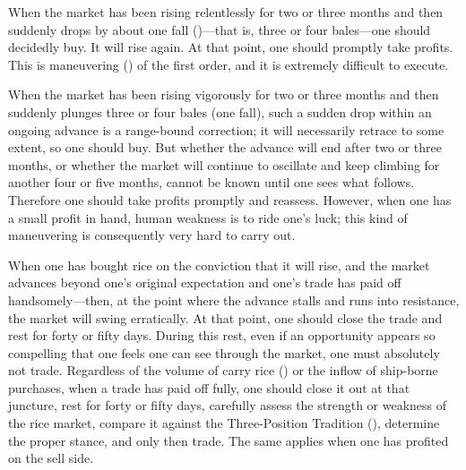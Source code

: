 \begin{sokyubox}
{\small\itshape\color{sokyubar} }

\medskip
When the market has been rising relentlessly for two or three
months and then suddenly drops by about one fall ()---that is, three or four bales---one should
decidedly buy. It will rise again. At that point, one should
promptly take profits. This is maneuvering () of
the first order, and it is extremely difficult to execute.
\end{sokyubox}

\commentary
When the market has been rising vigorously for two or three months
and then suddenly plunges three or four bales (one fall), such a
sudden drop within an ongoing advance is a range-bound correction;
it will necessarily retrace to some extent, so one should buy. But
whether the advance will end after two or three months, or whether
the market will continue to oscillate and keep climbing for another
four or five months, cannot be known until one sees what follows.
Therefore one should take profits promptly and reassess. However,
when one has a small profit in hand, human weakness is to ride one's
luck; this kind of maneuvering is consequently very hard to carry
out.


\begin{sokyubox}
{\small\itshape\color{sokyubar} }

\medskip
When one has bought rice on the conviction that it will rise, and
the market advances beyond one's original expectation and one's
trade has paid off handsomely---then, at the point where the
advance stalls and runs into resistance, the market will swing
erratically. At that point, one should close the trade and rest for
forty or fifty days. During this rest, even if an opportunity
appears so compelling that one feels one can see through the
market, one must absolutely not trade. Regardless of the volume of
carry rice () or the inflow of ship-borne
purchases, when a trade has paid off fully, one should close it out
at that juncture, rest for forty or fifty days, carefully assess
the strength or weakness of the rice market, compare it against the
Three-Position Tradition (), determine the
proper stance, and only then trade. The same applies when one has
profited on the sell side.
\end{sokyubox}

